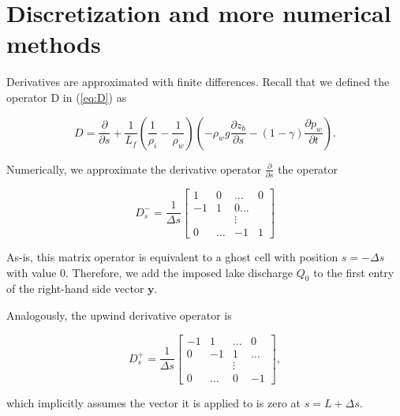 \documentclass[11pt]{article}
\begin{document}
\section{Discretization and more numerical methods}
Derivatives are approximated with finite differences. Recall that we defined the operator D in (\ref{eq:D}) as
\begin{linenomath*}
\begin{equation*}
D = \frac{\partial}{\partial s} + \frac{1}{L_f}\left(\frac{1}{\rho_i} - \frac{1}{\rho_w}\right)\left(-\rho_w g \frac{\partial z_b}{\partial s} - (1 - \gamma)\frac{\partial p_w}{\partial t}\right).
\end{equation*}
\end{linenomath*}
Numerically, we approximate the derivative operator $\frac{\partial}{\partial s}$ the operator
\begin{linenomath*}
\begin{equation}
\label{eq:Ds}
D_s^- = \frac{1}{\Delta s} \begin{bmatrix} 1 & 0 & \ldots & 0 \\ -1 & 1 & 0 \ldots \\
 & & \vdots & \\
 0 & \ldots & -1 & 1\end{bmatrix}
\end{equation}
\end{linenomath*}
As-is, this matrix operator is equivalent to a ghost cell with position $s = -\Delta s$ with value 0. Therefore, we add the imposed lake discharge $Q_0$ to the first entry of the right-hand side vector $\mathbf{y}$. 

Analogously, the upwind derivative operator is
\begin{linenomath*}
\begin{equation}
\label{eq:Dsup}
D_s^+ = \frac{1}{\Delta s} \begin{bmatrix} -1 & 1 & \ldots & 0 \\ 0 & -1 & 1 & \ldots \\ & & \vdots & \\ 0 & \ldots & 0 & -1 \end{bmatrix},
\end{equation}
\end{linenomath*}
which implicitly assumes the vector it is applied to is zero at $s = L + \Delta s$.
\end{document}
